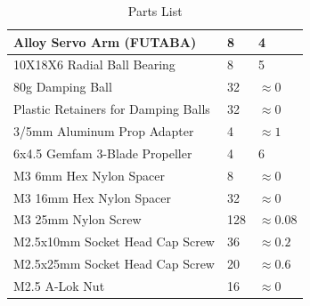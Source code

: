 \begin{table}[htbp]
\begin{tabularx}{\textwidth}{|X|l|l|}
Alloy Servo Arm (FUTABA) & 8 & 4\\ \hline
10X18X6 Radial Ball Bearing & 8 & 5\\ \hline
80g Damping Ball & 32 & $\approx 0$\\ \hline
Plastic Retainers for Damping Balls & 32 & $\approx 0$\\ \hline
3/5mm Aluminum Prop Adapter & 4 & $\approx 1$\\ \hline
6x4.5 Gemfam 3-Blade Propeller & 4 & 6\\ \hline
M3 6mm Hex Nylon Spacer & 8 & $\approx 0$\\ \hline
M3 16mm Hex Nylon Spacer & 32 & $\approx 0$\\ \hline
M3 25mm Nylon Screw & 128 & $\approx 0.08$\\ \hline
M2.5x10mm Socket Head Cap Screw & 36 & $\approx 0.2$\\ \hline
M2.5x25mm Socket Head Cap Screw & 20 & $\approx 0.6$\\ \hline
M2.5 A-Lok Nut & 16 & $\approx 0$\\ \hline 
\end{tabularx}
\label{tab:partslist}
\caption{Parts List}
\end{table}
\newpage
